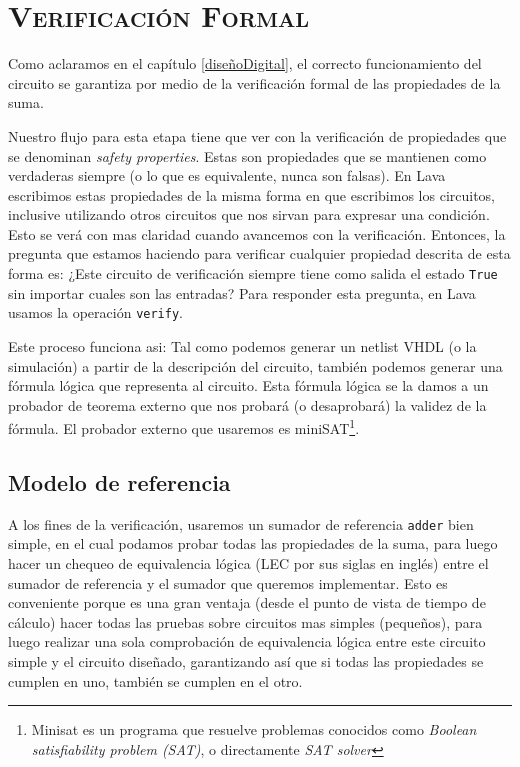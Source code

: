

\chapter{ \textsc{ Verificación Formal } }\label{verificacion}

Como aclaramos en el capítulo \ref{diseñoDigital}, el correcto funcionamiento del circuito se garantiza por medio de la verificación formal de las propiedades de la suma. 

Nuestro flujo para esta etapa tiene que ver con la verificación de propiedades que se denominan \emph{safety properties}. Estas  son propiedades que se mantienen como verdaderas siempre (o lo que es equivalente, nunca son falsas). En Lava escribimos estas propiedades de la misma forma en que escribimos los circuitos, inclusive utilizando otros circuitos que nos sirvan para expresar una condición. Esto se verá con mas claridad cuando avancemos con la verificación. Entonces, la pregunta que estamos haciendo para verificar cualquier propiedad descrita de esta forma es:  ¿Este circuito de verificación siempre tiene como salida el estado \verb.True. sin importar cuales son las entradas? Para responder esta pregunta, en Lava usamos la operación \verb.verify..

Este proceso funciona asi: Tal como podemos generar un netlist VHDL (o la simulación) a partir de la descripción del circuito, también podemos generar una fórmula lógica que representa al circuito. Esta fórmula lógica se la damos a un probador de teorema externo que nos probará (o desaprobará) la validez de la fórmula. El probador externo que usaremos es miniSAT\footnote{Minisat es un programa que resuelve problemas conocidos como \emph{Boolean satisfiability problem (SAT)}, o directamente \emph{SAT solver}}.

\section{Modelo de referencia}
A los fines de la verificación, usaremos un sumador de referencia \verb.adder. bien simple, en el cual podamos probar todas las propiedades de la suma, para luego hacer un chequeo de equivalencia lógica (LEC por sus siglas en inglés) entre el sumador de referencia y el sumador que queremos implementar. Esto es conveniente porque es una gran ventaja (desde el punto de vista de tiempo de cálculo) hacer todas las pruebas sobre circuitos mas simples (pequeños), para luego realizar una sola comprobación de equivalencia lógica entre este circuito simple y el circuito diseñado, garantizando así que si todas las propiedades se cumplen en uno, también se cumplen en el otro.


